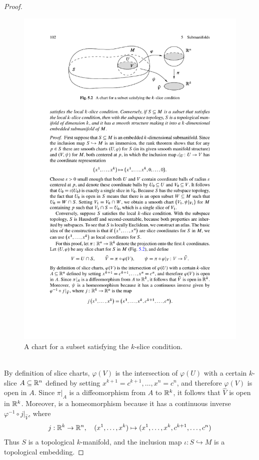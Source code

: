 \begin{proof}
\begin{figure}[h]
\includegraphics{pictures/slice-chart-1}
\caption{A chart for a subset satisfying the $k$-slice condition.}
\end{figure}\\
By definition of slice charts, $\varphi(V)$ is the intersection of $\varphi(U)$ with a certain $k$-slice $A\subseteq\mathbb{R}^n$ defined by setting $x^{k+1}=c^{k+1},\dots,x^n=c^n$, and therefore $\varphi(V)$ is open in $A$. Since $\pi|_A$ is a diffeomorphism from $A$ to $\mathbb{R}^k$, it follows that $\widehat{V}$ is open in $\mathbb{R}^k$. Moreover, is a homeomorphism because it has a continuous inverse $\varphi^{-1}\circ j|_{\widehat{V}}$, where
\[j:\mathbb{R}^k\to\mathbb{R}^n,\quad(x^1,\dots,x^k)\mapsto(x^1,\dots,x^k,c^{k+1},\dots,c^n)\]
Thus $S$ is a topological $k$-manifold, and the inclusion map $\iota:S\hookrightarrow M$ is a topological embedding.\par

\end{proof}
